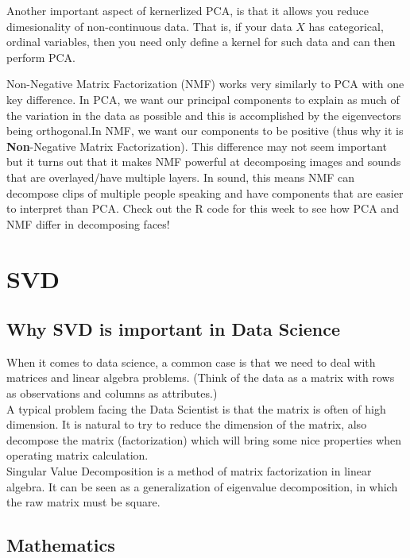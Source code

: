 \documentclass[a4paper]{article}
\begin{document}
Another important aspect of kernerlized PCA, is that it allows you reduce dimesionality of non-continuous data. That is, if your data $X$ has categorical, ordinal variables, then you need only define a kernel for such data and can then perform PCA.

Non-Negative Matrix Factorization (NMF) works very similarly to PCA with one key difference. In PCA, we want our principal components to explain as much of the variation in the data as possible and this is accomplished by the eigenvectors being orthogonal.In NMF, we want our components to be positive (thus why it is \textbf{Non}-Negative Matrix Factorization). This difference may not seem important but it turns out that it makes NMF powerful at decomposing images and sounds that are overlayed/have multiple layers. In sound, this means NMF can decompose clips of multiple people speaking and have components that are easier to interpret than PCA. Check out the R code for this week to see how PCA and NMF differ in decomposing faces!

\section{SVD}
\subsection{Why SVD is important in Data Science}

When it comes to data science, a common case is that we need to deal with matrices and linear algebra problems. (Think of the data as a matrix with rows as observations and columns as attributes.) \\

A typical problem facing the Data Scientist is that the matrix is often of high dimension. It is natural to try to reduce the dimension of the matrix, also decompose the matrix (factorization) which will bring some nice properties when operating matrix calculation.\\ 

Singular Value Decomposition is a method of matrix factorization in linear algebra. It can be seen as a generalization of eigenvalue decomposition, in which the raw matrix must be square.\\ 

\subsection{Mathematics}
\end{document}
